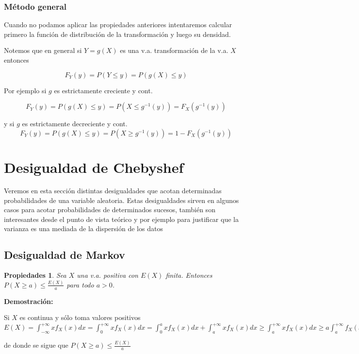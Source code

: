 \documentclass[handout]{beamer}\usepackage[]{graphicx}\usepackage[]{color}
\renewcommand{\leq}{\leqslant}
\renewcommand{\geq}{\geqslant}
\theoremstyle{plain}
\newtheorem{prop}{Propiedades}
\theoremstyle{definition}
\begin{document}
\subsubsection{Método general}
\begin{frame}


Cuando no podamos aplicar las propiedades anteriores intentaremos
calcular primero la función de distribución de la transformación
y luego su densidad.

Notemos que en general si $Y=g(X)$ es una v.a. transformación  de la
v.a. $X$ entonces

$$F_{Y}(y)=P(Y\leq y)=P(g(X)\leq y)$$

Por ejemplo si $g$ es estrictamente creciente y cont.

$$F_{Y}(y)=P(g(X)\leq y)=P(X\leq g^{-1}(y))=F_{X}(g^{-1}(y))$$

y si $g$ es estrictamente decreciente y cont.
$$F_{Y}(y)=P(g(X)\leq y)=P(X\geq g^{-1}(y))=1-F_{X}(g^{-1}(y))$$

\end{frame}
\section{Desigualdad de Chebyshef}
\begin{frame}




Veremos en esta sección distintas desigualdades que acotan determinadas probabilidades de
una variable aleatoria. Estas desigualdades sirven en algunos casos para acotar
probabilidades de determinados sucesos, también son interesantes desde el punto de vista
teórico y por ejemplo para justificar que la varianza es una mediada de la dispersión de
los datos
\end{frame}

\subsection{Desigualdad de Markov}
\begin{frame}

\begin{prop}
Sea $X$ una v.a. positiva con $E(X)$ finita. Entonces
$P(X\geq a)\leq \frac{E(X)}{a}$ para todo $a>0$.
\end{prop}
\end{frame}

\begin{frame}

\textbf{Demostración: }

Si $X$ es continua  y sólo toma valores positivos\newline
$\displaystyle E(X)=\int_{-\infty}^{+\infty} x f_{X}(x)
dx=\int_{0}^{+\infty} x f_{X}(x) dx=
\displaystyle \int_{0}^{a} x f_{X}(x)
dx+\int_{a}^{+\infty} x f_{X}(x) dx \geq \int_{a}^{+\infty} x
f_{X}(x) dx \geq\displaystyle a \int_{a}^{+\infty}
f_{X}(x) dx=a P(X\geq a)$

de donde se sigue que  $P(X\geq a)\leq \frac{E(X)}{a}$
\end{frame}
\end{document}

